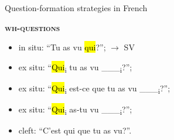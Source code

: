\documentclass[lesson_slides]{subfiles}
\begin{document}
\begin{frame}[c]{Question-formation strategies in French}

    \noindent \textbf{\textsc{wh-questions}}
    \begin{itemize}
        \item[\ding{227}] in situ: “Tu as vu \hl{qui}?”; $\longrightarrow$ SV
        \item[\ding{227}] ex situ: “\hl{Qui}\textsubscript{i} tu as vu \_\_\_\textsubscript{i}?”;
        \item[\ding{227}] ex situ: “\hl{Qui}\textsubscript{i} est-ce que tu as vu \_\_\_\textsubscript{i}?”; 
        \item[\ding{227}] ex situ: “\hl{Qui}\textsubscript{i} as-tu vu \_\_\_\textsubscript{i}?”;
        \item[\ding{227}] cleft: “C’est qui que tu as vu?”.
    \end{itemize}
   
\end{frame}

\end{document}
